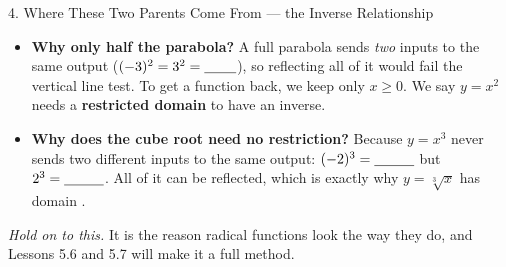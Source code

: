 \documentclass[10pt]{article}
\begin{document}
\begin{notesbox}{4. Where These Two Parents Come From --- the Inverse Relationship}
\begin{itemize}[leftmargin=1.5em, itemsep=3pt]
        $[0,\infty)$ because that is the \blank{2.0cm} of $y=x^2$ --- a parabola never produces a
        negative output, so a square root never accepts a negative input.
  \item \textbf{Why only half the parabola?} A full parabola sends \emph{two} inputs to the same
        output ($(-3)^2=3^2=\blank{0.8cm}$), so reflecting all of it would fail the vertical line
        test. To get a function back, we keep only $x\ge 0$. We say $y=x^2$ needs a
        \textbf{restricted domain} to have an inverse.
  \item \textbf{Why does the cube root need no restriction?} Because $y=x^3$ never sends two
        different inputs to the same output: $(-2)^3=\blank{1.0cm}$ but $2^3=\blank{1.0cm}$. All of
        it can be reflected, which is exactly why $y=\sqrt[3]{x}$ has domain \blank{2.4cm}.
\end{itemize}
\emph{Hold on to this.} It is the reason radical functions look the way they do, and Lessons 5.6 and
5.7 will make it a full method.
\end{notesbox}
\end{document}
